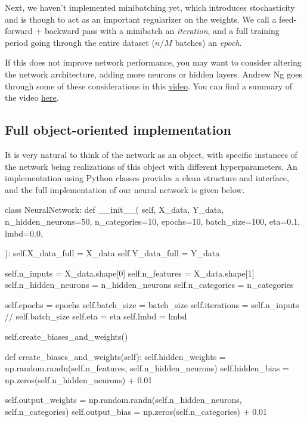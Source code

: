 \documentclass[%
oneside,                 %
final,                   %
10pt]{article}
\begin{document}
Next, we haven't implemented minibatching yet, which introduces stochasticity and is though to act as an important regularizer on the weights. We call a feed-forward + backward pass with a minibatch an \emph{iteration}, and a full training period
going through the entire dataset ($n/M$ batches) an \emph{epoch}.

If this does not improve network performance, you may want to consider altering the network architecture, adding more neurons or hidden layers.  
Andrew Ng goes through some of these considerations in this \href{{https://youtu.be/F1ka6a13S9I}}{video}. You can find a summary of the video \href{{https://kevinzakka.github.io/2016/09/26/applying-deep-learning/}}{here}.  

\subsection{Full object-oriented implementation}

It is very natural to think of the network as an object, with specific instances of the network
being realizations of this object with different hyperparameters. An implementation using Python classes provides a clean structure and interface, and the full implementation of our neural network is given below.


\bpycod
class NeuralNetwork:
    def __init__(
        self,
        X_data,
        Y_data,
        n_hidden_neurons=50,
        n_categories=10,
        epochs=10,
        batch_size=100,
        eta=0.1,
        lmbd=0.0,

    ):
        self.X_data_full = X_data
        self.Y_data_full = Y_data

        self.n_inputs = X_data.shape[0]
        self.n_features = X_data.shape[1]
        self.n_hidden_neurons = n_hidden_neurons
        self.n_categories = n_categories

        self.epochs = epochs
        self.batch_size = batch_size
        self.iterations = self.n_inputs // self.batch_size
        self.eta = eta
        self.lmbd = lmbd

        self.create_biases_and_weights()

    def create_biases_and_weights(self):
        self.hidden_weights = np.random.randn(self.n_features, self.n_hidden_neurons)
        self.hidden_bias = np.zeros(self.n_hidden_neurons) + 0.01

        self.output_weights = np.random.randn(self.n_hidden_neurons, self.n_categories)
        self.output_bias = np.zeros(self.n_categories) + 0.01
\end{document}
